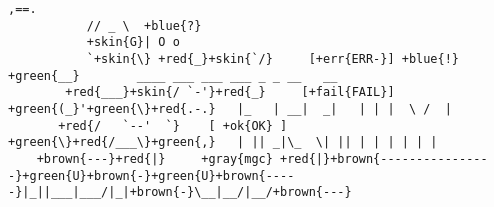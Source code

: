 \documentclass[]{article}
\begin{document}
\begin{Verbatim}[commandchars=+\{\}]
            ,==.
           // _ \  +blue{?}
           +skin{G}| O o
           `+skin{\} +red{_}+skin{`/}     [+err{ERR-}] +blue{!} +green{__}        ____ ___ ___ ___ _ _ __   __
        +red{___}+skin{/ `-'}+red{_}     [+fail{FAIL}]  +green{(_}'+green{\}+red{.-.}   |_   | __|  _|   | | |  \ /  |
       +red{/   `--'  `}    [ +ok{OK} ]    +green{\}+red{/___\}+green{,}   | || _|\_  \| || | | | | | |
    +brown{---}+red{|}     +gray{mgc} +red{|}+brown{----------------}+green{U}+brown{-}+green{U}+brown{-----}|_||___|___/|_|+brown{-}\__|__/|__/+brown{---}
\end{Verbatim}
\end{document}
